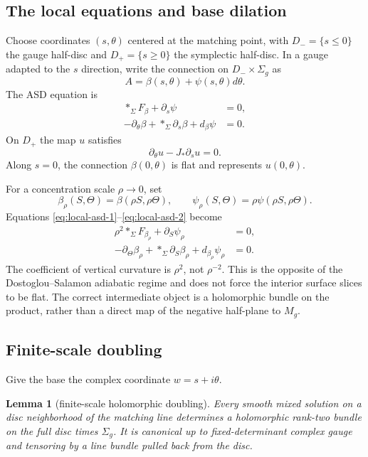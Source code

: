 \documentclass[11pt]{amsart}
\newtheorem{lemma}[theorem]{Lemma}
\theoremstyle{definition}
\theoremstyle{remark}
\theoremstyle{plain}
\begin{document}
\subsection{The local equations and base dilation}\label{sec:local-equations}
Choose coordinates $(s,\theta)$ centered at the matching point, with
$D_-=\{s\leq0\}$ the gauge half-disc and $D_+=\{s\geq0\}$ the symplectic
half-disc.  In a gauge adapted to the $s$ direction, write the connection
on $D_-\times\Sigma_g$ as
\[
                         A=\beta(s,\theta)+\psi(s,\theta)d\theta.
\]
The ASD equation is
\begin{align}
 *_\Sigma F_\beta+\partial_s\psi&=0,
                                      \label{eq:local-asd-1}\\
 -\partial_\theta\beta+*_\Sigma\partial_s\beta
                  +d_\beta\psi&=0.  \label{eq:local-asd-2}
\end{align}
On $D_+$ the map $u$ satisfies
\begin{equation}\label{eq:local-CR}
                   \partial_\theta u-J_*\partial_su=0.
\end{equation}
Along $s=0$, the connection $\beta(0,\theta)$ is flat and represents
$u(0,\theta)$.

For a concentration scale $\rho\to0$, set
\[
 \beta_\rho(S,\Theta)=\beta(\rho S,\rho\Theta),
 \qquad
 \psi_\rho(S,\Theta)=\rho\psi(\rho S,\rho\Theta).
\]
Equations \eqref{eq:local-asd-1}--\eqref{eq:local-asd-2} become
\begin{align}
 \rho^2 *_\Sigma F_{\beta_\rho}+\partial_S\psi_\rho&=0,
                                      \label{eq:scaled-asd-1}\\
 -\partial_\Theta\beta_\rho+*_\Sigma\partial_S\beta_\rho
                  +d_{\beta_\rho}\psi_\rho&=0.  \label{eq:scaled-asd-2}
\end{align}
The coefficient of vertical curvature is $\rho^2$, not $\rho^{-2}$.
This is the opposite of the Dostoglou--Salamon adiabatic regime and does
not force the interior surface slices to be flat.  The correct intermediate
object is a holomorphic bundle on the product, rather than a direct map of
the negative half-plane to $M_g$.

\subsection{Finite-scale doubling}\label{sec:doubling}
Give the base the complex coordinate $w=s+i\theta$.

\begin{lemma}[finite-scale holomorphic doubling]\label{lem:doubling}
Every smooth mixed solution on a disc neighborhood of the matching line
determines a holomorphic rank-two bundle on the full disc times $\Sigma_g$.
It is canonical up to fixed-determinant complex gauge and tensoring by a
line bundle pulled back from the disc.
\end{lemma}
\end{document}
